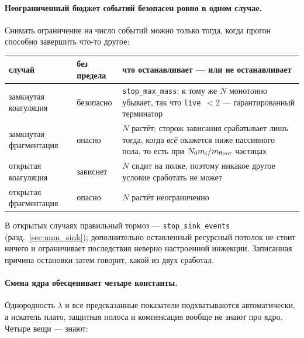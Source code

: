 \documentclass[a4paper,12pt]{article}
\newcommand{\code}[1]{\texttt{#1}}
\begin{document}
\paragraph{Неограниченный бюджет событий безопасен ровно в одном случае.}
Снимать ограничение на число событий можно только тогда, когда прогон
способно завершить что-то другое:

\begin{center}
\small
\begin{tabular}{@{}l l p{7.4cm}@{}}
\toprule
случай & без предела & что останавливает --- или не останавливает \\
\midrule
замкнутая коагуляция   & безопасно & \code{stop\_max\_mass}; к тому же $N$ монотонно
                                     убывает, так что \code{live}~$<2$ --- гарантированный
                                     терминатор \\
замкнутая фрагментация & опасно    & $N$ растёт; сторож зависания срабатывает лишь
                                     тогда, когда \emph{всё} окажется ниже пассивного
                                     пола, то есть при $N_0 m_i/m_{\rm floor}$ частицах \\
открытая коагуляция    & зависнет  & $N$ сидит на полке, поэтому никакое другое
                                     условие сработать не может \\
открытая фрагментация  & опасно    & $N$ растёт неограниченно \\
\bottomrule
\end{tabular}
\end{center}

В открытых случаях правильный тормоз --- \code{stop\_sink\_events}
(разд.~\ref{sec:num_sink}); дополнительно оставленный ресурсный потолок не
стоит ничего и ограничивает последствия неверно настроенной инжекции.
Записанная причина остановки затем говорит, какой из двух сработал.

\paragraph{Смена ядра обесценивает четыре константы.}
Однородность $\lambda$ и все предсказанные показатели подхватываются
автоматически, а искатель плато, защитная полоса и компенсация вообще не
знают про ядро. Четыре вещи --- знают:
\end{document}
